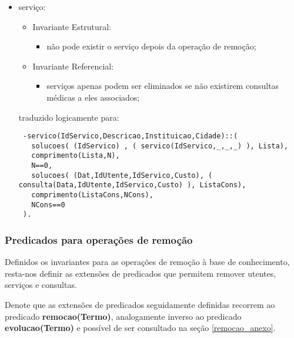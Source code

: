 \documentclass[
  oneside,
  10pt, a4paper,
  footinclude=true,
  headinclude=true,
  cleardoublepage=empty
]{scrbook}
\begin{document}
\begin{itemize}
\item   serviço:
\begin{itemize}
\item        Invariante Estrutural:
\begin{itemize}
\item         não pode existir o serviço depois da operação de remoção;
\end{itemize}
\item        Invariante Referencial:
\begin{itemize}
\item         serviços apenas podem ser eliminados se não existirem consultas médicas a eles associados;
\end{itemize}
\end{itemize}
traduzido logicamente para:
\begin{lstlisting}
 -servico(IdServico,Descricao,Instituicao,Cidade)::(
   solucoes( (IdServico) , ( servico(IdServico,_,_,_) ), Lista),
   comprimento(Lista,N),
   N==0,
   solucoes( (Dat,IdUtente,IdServico,Custo), ( consulta(Data,IdUtente,IdServico,Custo) ), ListaCons),
   comprimento(ListaCons,NCons),
   NCons==0
 ).
\end{lstlisting}


\end{itemize}
\subsubsection{Predicados para operações de remoção}
Definidos os invariantes para as operações de remoção à base de conhecimento, resta-nos definir as extensões de predicados que permitem remover utentes, serviços e consultas.\par
Denote que as extensões de predicados seguidamente definidas recorrem ao predicado \textbf{remocao(Termo)}, analogamente inverso ao predicado  \textbf{evolucao(Termo)} e possível de ser consultado na seção \ref{remocao_anexo}.
\end{document}
